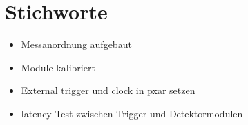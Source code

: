 \documentclass[usenames,dvipsnames]{include/protokollclass}
\begin{document}
    \FrontMatter
\begin{titlepage}


\end{titlepage}

    \begingroup \let\clearpage\relax    %
    \tableofcontents                    %
    \listoffigures
    \listoftables
    \endgroup



    \MainMatter
    
            
%    
%
%    
%
%	 
%
	
	\chapter{Stichworte}
	\begin{itemize}
		\item Messanordnung aufgebaut
		\item Module kalibriert
		\item External trigger und clock in pxar setzen
		\item latency Test zwischen Trigger und Detektormodulen
	\end{itemize}
\end{document}
